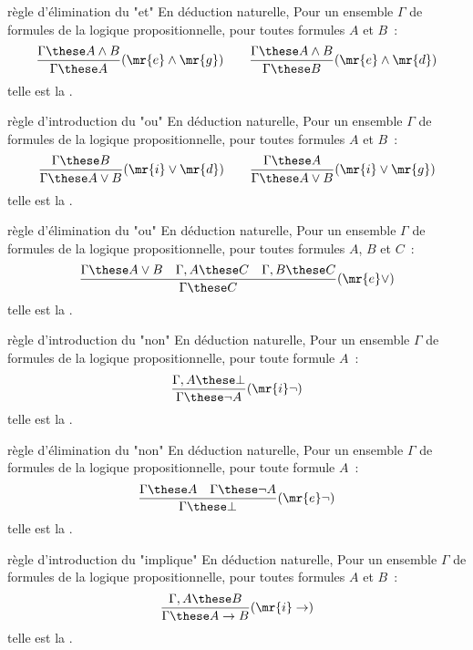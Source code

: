 \begin{adjustwidth}{-3cm}{-3cm}
\begin{definition}{7.9}{règle d'élimination du "et"}
    En déduction naturelle, Pour un ensemble $\Gamma$ de formules de la logique propositionnelle, pour toutes formules $A$ et $B$~:
    $$\frac{\Gamma \these A \wedge B}{\Gamma \these A}(\mr{e}\wedge\mr{g}) \qquad \frac{\Gamma \these A \wedge B}{\Gamma \these B}(\mr{e}\wedge\mr{d})$$
    telle est la .
\end{definition}

\newcommand{\ou}[0]{\vee}

\begin{definition}{7.10}{règle d'introduction du "ou"}
    En déduction naturelle, Pour un ensemble $\Gamma$ de formules de la logique propositionnelle, pour toutes formules $A$ et $B$~:
    $$\frac{\Gamma \these B}{\Gamma \these A \ou B}(\mr{i}\ou\mr{d}) \qquad \frac{\Gamma \these A}{\Gamma \these A \ou B}(\mr{i}\ou\mr{g})$$
    telle est la .
\end{definition}

\begin{definition}{7.11}{règle d'élimination du "ou"}
    En déduction naturelle, Pour un ensemble $\Gamma$ de formules de la logique propositionnelle, pour toutes formules $A$, $B$ et $C$~:
    $$\frac{\Gamma \these A \ou B \quad \Gamma,A \these C \quad \Gamma,B \these C}{\Gamma \these C}(\mr{e}\ou)$$
    telle est la .
\end{definition}

\begin{definition}{7.12}{règle d'introduction du "non"}
    En déduction naturelle, Pour un ensemble $\Gamma$ de formules de la logique propositionnelle, pour toute formule $A$~:
    $$\frac{\Gamma,A \these \bot}{\Gamma \these \lnot A}(\mr{i}\lnot)$$
    telle est la .
\end{definition}

\begin{definition}{7.13}{règle d'élimination du "non"}
    En déduction naturelle, Pour un ensemble $\Gamma$ de formules de la logique propositionnelle, pour toute formule $A$~:
    $$\frac{\Gamma \these A \quad \Gamma \these \lnot A}{\Gamma \these \bot}(\mr{e}\lnot)$$
    telle est la .
\end{definition}

\begin{definition}{7.14}{règle d'introduction du "implique"}
    En déduction naturelle, Pour un ensemble $\Gamma$ de formules de la logique propositionnelle, pour toutes formules $A$ et $B$~:
    $$\frac{\Gamma,A \these B}{\Gamma \these A \to B}(\mr{i}\to)$$
    telle est la .
\end{definition}


\end{adjustwidth}
